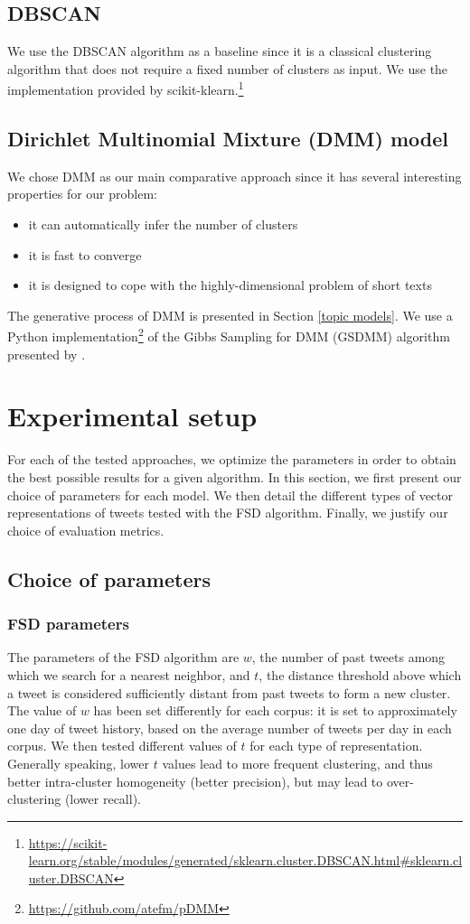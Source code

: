 \subsection{DBSCAN}
We use the DBSCAN algorithm \citep{ester1996density} as a baseline since it is a classical clustering algorithm that does not require a fixed number of clusters as input. We use the implementation provided by scikit-klearn.\footnote{\url{https://scikit-learn.org/stable/modules/generated/sklearn.cluster.DBSCAN.html\#sklearn.cluster.DBSCAN}}

\subsection{Dirichlet Multinomial Mixture (DMM) model}
We chose DMM as our main comparative approach since it has several interesting properties for our problem: \begin{itemize}
    \item it can automatically infer the number of clusters
    \item it is fast to converge
    \item it is designed to cope with the highly-dimensional problem of short texts
\end{itemize}

The generative process of DMM is presented in Section \ref{topic models}. We use a Python implementation\footnote{\url{https://github.com/atefm/pDMM}} of the Gibbs Sampling for DMM (GSDMM) algorithm presented by \citet{yin_dirichlet_2014}.

\section{Experimental setup}

For each of the tested approaches, we optimize the parameters in order to obtain the best possible results for a given algorithm. In this section, we first present our choice of parameters for each model. We then detail the different types of vector representations of tweets tested with the FSD algorithm. Finally, we justify our choice of evaluation metrics.

\subsection{Choice of parameters}

\subsubsection{FSD parameters}
The parameters of the FSD algorithm are $w$, the number of past tweets among which we search for a nearest neighbor, and $t$, the distance threshold above which a tweet is considered sufficiently distant from past tweets to form a new cluster. The value of $w$ has been set differently for each corpus: it is set to approximately one day of tweet history, based on the average number of tweets per day in each corpus. We then tested different values of $t$ for each type of representation. Generally speaking, lower $t$ values lead to more frequent clustering, and thus better intra-cluster homogeneity (better precision), but may lead to over-clustering (lower recall).

